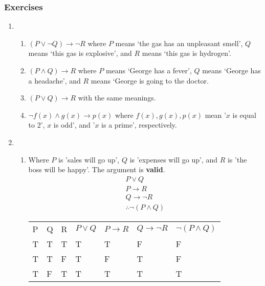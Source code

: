 \documentclass[a4paper, 11pt]{article}
\newcommand\setItemnumber[1]{\setcounter{enumi}{\numexpr#1-1\relax}}
\begin{document}
\subsubsection{Exercises}
\begin{enumerate}
  \item
        \begin{enumerate}
          \item $(P \vee \neg Q) \rightarrow \neg R$ where $P$ means `the gas has an unpleasant smell', $Q$ means `this gas is explosive', and $R$ means `this gas is hydrogen'.
          \item $(P \wedge Q) \rightarrow R$ where $P$ means `George has a fever', $Q$ means `George has a headache', and $R$ means `George is going to the doctor.
          \item $(P \vee Q) \rightarrow R$ with the same meanings.
          \item $\neg f(x) \wedge g(x) \rightarrow p(x)$ where $f(x), g(x), p(x)$ mean '$x$ is equal to 2', $x$ is odd', and '$x$ is a prime', respectively.
        \end{enumerate}
        \setItemnumber{4}
  \item
        \begin{enumerate}
          \item Where $P$ is 'sales will go up', $Q$ is 'expenses will go up', and $R$ is 'the boss will be happy'. The argument is \textbf{valid}.\\
                \begin{align*}
                  P \vee Q             \\
                  P \rightarrow R      \\
                  Q \rightarrow \neg R \\
                  \therefore \neg (P \wedge Q)
                \end{align*}
                \begin{table}[htbp]
                  \centering
                  \begin{tabular}{lllllll}
                    P & Q & R & $P \vee Q$ & $P \rightarrow R$ & $Q \rightarrow \neg R$ & $\neg (P \wedge Q)$ \\
                    T & T & T & T          & T                 & F                      & F                   \\
                    T & T & F & T          & F                 & T                      & F                   \\
                    T & F & T & T          & T                 & T                      & T                   \\

\end{tabular}
\end{table}
\end{enumerate}
\end{enumerate}
\end{document}
